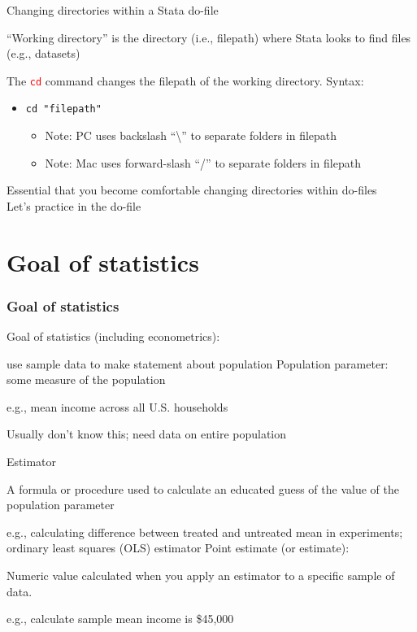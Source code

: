\begin{frame}{Changing directories within a Stata do-file}
	
	``Working directory'' is the directory (i.e., filepath) where Stata looks to find files (e.g., datasets)

	\vspace{3mm}
	The \textcolor{red}{\texttt{cd}} command changes the filepath of the working directory. Syntax: \\
	\begin{itemize}
		\item [] \texttt{cd "filepath"}
		\begin{itemize}
			\item [] Note: PC uses backslash ``\textbackslash'' to separate folders in filepath
			\item [] Note: Mac uses forward-slash ``/'' to separate folders in filepath
		\end{itemize}
	\end{itemize}
	
	\vspace{3mm}	
	Essential that you become comfortable changing directories within do-files \\
	\vspace{3mm}
	Let's practice in the do-file	
	
\end{frame}

\section[Goal of statistics]{Goal of statistics}

\begin{frame}\frametitle{Goal of statistics}

	Goal of statistics (including econometrics):
	\bi
		\item use sample data to make statement about population
	\ei
	\vspace{2mm}	
	Population parameter: some measure of the population
	\bi
		\item e.g., mean income across all U.S. households
		\item Usually don't know this; need data on entire population
	\ei
	\vspace{2mm}	

	Estimator
	\bi
		\item A formula or procedure used to calculate an educated guess of the value of the population parameter
		\item e.g., calculating difference between treated and untreated mean in experiments; ordinary least squares (OLS) estimator
	\ei
	Point estimate (or estimate):
	\bi
		\item Numeric value calculated when you apply an estimator to a specific sample of data.
		\item e.g., calculate sample mean income is \$45,000
	\ei
	
\end{frame}

